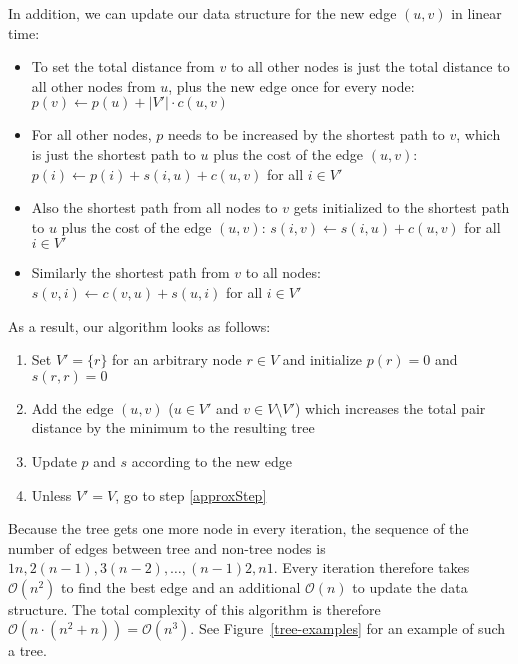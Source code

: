 \documentclass[a4paper, oneside]{discothesis}
\begin{document}
In addition, we can update our data structure for the new edge $(u,v)$ in linear time:
\begin{itemize}
\item To set the total distance from $v$ to all other nodes is just the total distance to all other nodes from $u$, plus the new edge once for every node: $p(v)\gets p(u)+|V'|\cdot c(u,v)$
\item For all other nodes, $p$ needs to be increased by the shortest path to $v$, which is just the shortest path to $u$ plus the cost of the edge $(u,v)$: $p(i)\gets p(i)+s(i,u)+c(u,v)$ for all $i\in V'$
\item Also the shortest path from all nodes to $v$ gets initialized to the shortest path to $u$ plus the cost of the edge $(u,v)$: $s(i,v)\gets s(i,u)+c(u,v)$ for all $i\in V'$
\item Similarly the shortest path from $v$ to all nodes: $s(v,i)\gets c(v,u)+s(u,i)$ for all $i\in V'$
\end{itemize}

As a result, our algorithm looks as follows:
\begin{enumerate}
\item Set $V'=\{r\}$ for an arbitrary node $r\in V$ and initialize $p(r)=0$ and $s(r,r)=0$
\item Add the edge $(u,v)$ ($u\in V'$ and $v\in V\setminus V'$) which increases the total pair distance by the minimum to the resulting tree
\label{approxStep}
\item Update $p$ and $s$ according to the new edge
\item Unless $V'=V$, go to step \ref{approxStep}
\end{enumerate}

Because the tree gets one more node in every iteration, the sequence of the number of edges between tree and non-tree nodes is $1n,2(n-1),3(n-2),\dots,(n-1)2,n1$. Every iteration therefore takes $\mathcal{O}(n^2)$ to find the best edge and an additional $\mathcal{O}(n)$ to update the data structure. The total complexity of this algorithm is therefore $\mathcal{O}(n\cdot(n^2+n))=\mathcal{O}(n^3)$. See Figure~\ref{tree-examples} for an example of such a tree.

\end{document}
